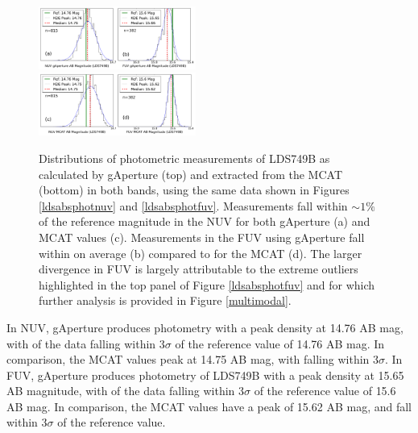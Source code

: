 \documentclass[trackchanges,preprint2]{aastex}
\begin{document}
\begin{figure}[h!]
\includegraphics[width=0.46\textwidth,keepaspectratio]{Fig08a.pdf}\\
\includegraphics[width=0.46\textwidth,keepaspectratio]{Fig08b.pdf}
\caption{Distributions of photometric measurements of LDS749B as calculated by gAperture (top) and extracted from the MCAT (bottom) in both bands, using the same data shown in Figures \ref{ldsabsphotnuv} and \ref{ldsabsphotfuv}. Measurements fall within $\sim1\%$ of the reference magnitude in the NUV for both gAperture (a) and MCAT values (c). Measurements in the FUV using gAperture fall within  on average (b) compared to  for the MCAT (d). The larger divergence in FUV is largely attributable to the extreme outliers highlighted in the top panel of Figure \ref{ldsabsphotfuv} and for which further analysis is provided in Figure \ref{multimodal}.
\label{magdist}}
\end{figure}

In NUV, gAperture produces photometry with a peak density at 14.76 AB mag, with  of the data falling within 3$\sigma$ of the reference value of 14.76 AB mag. In comparison, the MCAT values peak at 14.75 AB mag, with  falling within 3$\sigma$. In FUV, gAperture produces photometry of LDS749B with a peak density at 15.65 AB magnitude, with  of the data falling within 3$\sigma$ of the reference value of 15.6 AB mag. In comparison, the MCAT values have a peak of 15.62 AB mag, and  fall within 3$\sigma$ of the reference value.
\end{document}
